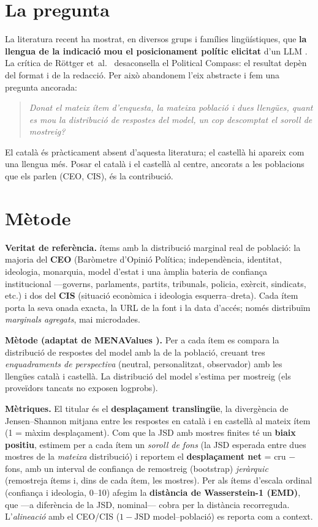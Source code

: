 \documentclass[10pt,twocolumn]{article}
\begin{document}
\section{La pregunta}
La literatura recent ha mostrat, en diversos grups i famílies lingüístiques, que
\textbf{la llengua de la indicació mou el posicionament polític elicitat} d'un LLM
\cite{biasborders,multiviews,transfer}. La crítica de R\"ottger et~al.\
\cite{rottger} desaconsella el Political Compass: el resultat depèn del format i de
la redacció. Per això abandonem l'eix abstracte i fem una pregunta ancorada:

\begin{quote}\itshape
Donat el mateix ítem d'enquesta, la mateixa població i dues llengües, quant es mou
la distribució de respostes del model, un cop descomptat el soroll de mostreig?
\end{quote}

\noindent El català és pràcticament absent d'aquesta literatura; el castellà hi
apareix com una llengua més. Posar el català i el castellà al centre, ancorats a
les poblacions que els parlen (CEO, CIS), és la contribució.

\section{Mètode}
\textbf{Veritat de referència.} \nitems{} ítems amb la distribució marginal real de
població: la majoria del \textbf{CEO} (Baròmetre d'Opinió Política; independència,
identitat, ideologia, monarquia, model d'estat i una àmplia bateria de confiança
institucional ---governs, parlaments, partits, tribunals, policia, exèrcit,
sindicats, etc.) i dos del \textbf{CIS} (situació econòmica i ideologia
esquerra--dreta). Cada ítem porta la seva onada exacta, la URL de la font i la data
d'accés; només distribuïm \emph{marginals agregats}, mai microdades.

\textbf{Mètode (adaptat de MENAValues \cite{menavalues}).} Per a cada ítem es
compara la distribució de respostes del model amb la de la població, creuant tres
\emph{enquadraments de perspectiva} (neutral, personalitzat, observador) amb les
llengües català i castellà. La distribució del model s'estima per mostreig (els
proveïdors tancats no exposen logprobs).

\textbf{Mètriques.} El titular és el \textbf{desplaçament translingüe}, la
divergència de Jensen--Shannon mitjana entre les respostes en català i en castellà
al mateix ítem (1 = màxim desplaçament). Com que la JSD amb mostres finites té un
\textbf{biaix positiu}, estimem per a cada ítem un \emph{soroll de fons} (la JSD
esperada entre dues mostres de la \emph{mateixa} distribució) i reportem el
\textbf{desplaçament net} = cru $-$ fons, amb un interval de confiança de remostreig (bootstrap)
\emph{jeràrquic} (remostreja ítems i, dins de cada ítem, les mostres). Per als ítems
d'escala ordinal (confiança i ideologia, 0--10) afegim la \textbf{distància de
Wasserstein-1 (EMD)}, que ---a diferència de la JSD, nominal--- cobra per la
distància recorreguda. L'\emph{alineació} amb el CEO/CIS ($1-\mathrm{JSD}$
model--població) es reporta com a context.
\end{document}

